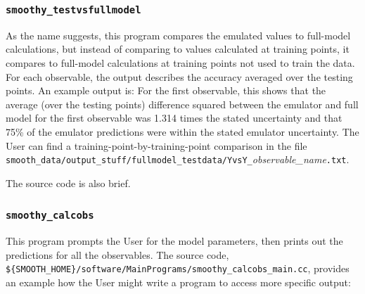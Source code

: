 \documentclass[UserManual.tex]{subfiles}
\begin{document}
\begin{sloppypar}
\subsubsection{{\tt smoothy\_testvsfullmodel}}
As the name suggests, this program compares the emulated values to full-model calculations, but instead of comparing to values calculated at training points, it compares to full-model calculations at training points not used to train the data.
For each observable, the output describes the accuracy averaged over the testing points. An example output is:
\vspace*{-8pt}{\tt \begin{Verbatim}[commandchars=\\\{\}]
% \textcolor{darkred}{smoothy_testvsfullmodel}
 iY=0: <(Y-Yreal)^2>/SigmaY^2_emulator=1.313787
 percent < 1 sigma = 75.000000
 iY=1: <(Y-Yreal)^2>/SigmaY^2_emulator=1.304912
 percent < 1 sigma = 69.642857
 .
\end{Verbatim}
}\vspace*{-8pt}
For the first observable, this shows that the average (over the testing points) difference squared between the emulator and full model for the first observable was 1.314 times the stated uncertainty and that 75\% of the emulator predictions were within the stated emulator uncertainty. The User can find a training-point-by-training-point comparison in the file {\tt smooth\_data/output\_stuff/fullmodel\_testdata/YvsY\_}{\it observable\_name}{\tt.txt}.

The source code is also brief.
\vspace*{-8pt}

\subsubsection{{\tt smoothy\_calcobs}}
This program prompts the User for the model parameters, then prints out the predictions for all the observables. The source code, {\tt \$\{SMOOTH\_HOME\}/software/MainPrograms/smoothy\_calcobs\_main.cc}, provides an example how the User might write a program to access more specific output:
\end{sloppypar}
\end{document}
